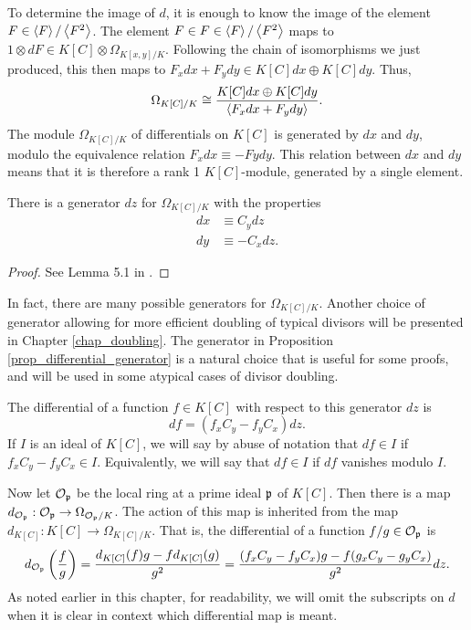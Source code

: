 To determine the image of $d$, it is enough to know the image of the element $F \in \pid F / \pid{F^2}$.
The element $F \in F \in \pid F / \pid{F^2}$ maps to $1 \otimes dF \in K[C] \otimes \Omega_{K[x,y]/K}$.
Following the chain of isomorphisms we just produced, this then maps to $F_xdx + F_ydy \in K[C]dx \oplus K[C]dy$.
Thus,
\[ \Omega_{K[C]/K} \cong \frac {K[C]dx \oplus K[C]dy} {\pid{F_xdx + F_ydy}}. \]
The module $\Omega_{K[C]/K}$ of differentials on $K[C]$ is generated by $dx$ and $dy$,
modulo the equivalence relation $F_xdx \equiv -Fydy$.
This relation between $dx$ and $dy$ means that it is therefore a rank 1 $K[C]$-module, generated by a single element.
\begin{proposition}
  \label{prop_differential_generator}
  There is a generator $dz$ for $\Omega_{K[C]/K}$ with the properties
  \begin{align*}
    dx &\equiv C_ydz \\
    dy &\equiv -C_xdz.
  \end{align*}
\end{proposition}
\begin{proof}
  See Lemma 5.1 in \cite{salem07}.
\end{proof}
In fact, there are many possible generators for $\Omega_{K[C]/K}$.
Another choice of generator allowing for more efficient doubling of typical divisors
will be presented in Chapter \ref{chap_doubling}.
The generator in Proposition \ref{prop_differential_generator} is a natural choice
that is useful for some proofs, and will be used in some atypical cases of divisor doubling.

The differential of a function $f \in K[C]$ with respect to this generator $dz$ is
\[ df = (f_xC_y - f_yC_x)dz. \]
If $I$ is an ideal of $K[C]$,
we will say by abuse of notation that $df \in I$ if $f_xC_y - f_yC_x \in I$.
Equivalently, we will say that $df \in I$ if $df$ vanishes modulo $I$.

Now let $\cal O_{\frak p}$ be the local ring at a prime ideal $\frak p$ of $K[C]$.
Then there is a map $d_{\cal O_{\frak p}} : \cal O_{\frak p} \to \Omega_{\cal O_{\frak p}/K}$.
The action of this map is inherited from the map $d_{K[C]} : K[C] \to \Omega_{K[C]/K}$.
That is, the differential of a function $f/g \in \cal O_{\frak p}$ is
\[ d_{\cal O_{\frak p}} \left( \frac f g \right) = \frac{d_{K[C]}(f)g - fd_{K[C]}(g)}{g^2}
 = \frac{(f_xC_y - f_yC_x)g - f(g_xC_y - g_yC_x)}{g^2} dz . \]
As noted earlier in this chapter, for readability, we will omit the subscripts on $d$
when it is clear in context which differential map is meant.

